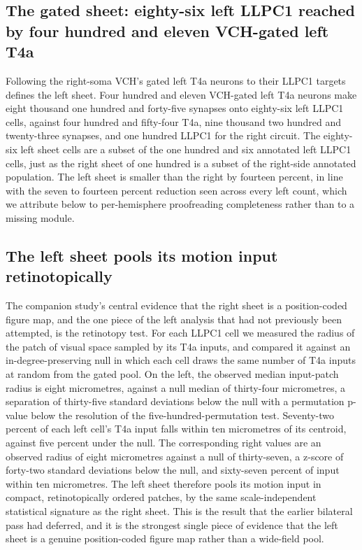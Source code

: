 \documentclass[11pt]{article}
\begin{document}
\subsection{The gated sheet: eighty-six left LLPC1 reached by four hundred and eleven VCH-gated left T4a}

Following the right-soma VCH's gated left T4a neurons to their LLPC1 targets defines the left
sheet. Four hundred and eleven VCH-gated left T4a neurons make eight thousand one hundred and
forty-five synapses onto eighty-six left LLPC1 cells, against four hundred and fifty-four T4a,
nine thousand two hundred and twenty-three synapses, and one hundred LLPC1 for the right circuit.
The eighty-six left sheet cells are a subset of the one hundred and six annotated left LLPC1
cells, just as the right sheet of one hundred is a subset of the right-side annotated population.
The left sheet is smaller than the right by fourteen percent, in line with the seven to fourteen
percent reduction seen across every left count, which we attribute below to per-hemisphere
proofreading completeness rather than to a missing module.

\subsection{The left sheet pools its motion input retinotopically}

The companion study's central evidence that the right sheet is a position-coded figure map, and
the one piece of the left analysis that had not previously been attempted, is the retinotopy
test. For each LLPC1 cell we measured the radius of the patch of visual space sampled by its T4a
inputs, and compared it against an in-degree-preserving null in which each cell draws the same
number of T4a inputs at random from the gated pool. On the left, the observed median input-patch
radius is eight micrometres, against a null median of thirty-four micrometres, a separation of
thirty-five standard deviations below the null with a permutation p-value below the resolution of
the five-hundred-permutation test. Seventy-two percent of each left cell's T4a input falls within
ten micrometres of its centroid, against five percent under the null. The corresponding right
values are an observed radius of eight micrometres against a null of thirty-seven, a z-score of
forty-two standard deviations below the null, and sixty-seven percent of input within ten
micrometres. The left sheet therefore pools its motion input in compact, retinotopically ordered
patches, by the same scale-independent statistical signature as the right sheet. This is the
result that the earlier bilateral pass had deferred, and it is the strongest single piece of
evidence that the left sheet is a genuine position-coded figure map rather than a wide-field
pool.
\end{document}
